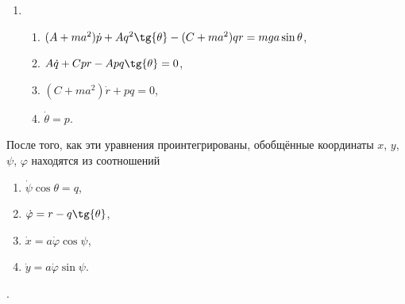 \begin{enumerate}
$L = \frac{1}{2}m\left( \dot{x}^2 + \dot{y}^2 +
a^2(\dot{\theta}^2 + \dot{\psi}^2\sin^2{\theta}) +
2a\dot{x}(\dot{\theta}\cos{\theta}\sin{\psi}+\dot{\psi}\sin{\theta}\cos{\psi}) -
2a\dot{y}(\dot{\theta}\cos{\theta}\cos{\psi}-\dot{\psi}\sin{\theta}\sin{\psi}) +
\right) + \frac{1}{2}A(\dot{\theta}^2 + \dot{\psi}^2\cos^2{\theta}) +
\frac{1}{2}C(\dot{\psi}\sin{\theta} + \dot{\varphi})^2 -
mga\cos{\theta}$;
\item \begin{enumerate}
\item $(A + ma^2)\dot{p} + Aq^2\tg{\theta} -
(C + ma^2)qr = mga\sin{\theta}$,
\item$A\dot{q} + Cpr - Apq\tg{\theta} = 0$,
\item$(C + ma^2)\dot{r} + pq = 0$,
\item$\dot{\theta} = p$.
\end{enumerate}
\end{enumerate}
После того, как эти уравнения проинтегрированы, обобщённые координаты
$x$, $y$, $\psi$, $\varphi$ находятся из соотношений
\begin{enumerate}
\item $\dot{\psi}\cos{\theta} = q$,
\item $\dot{\varphi} = r -q\tg{\theta}$,
\item $\dot{x} = a\dot{\varphi}\cos{\psi}$,
\item $\dot{y} = a\dot{\varphi}\sin{\psi}$.
\end{enumerate}.
